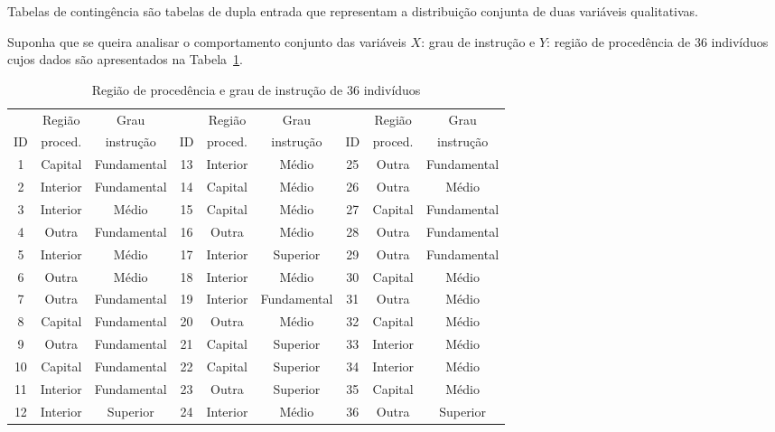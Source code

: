 \documentclass[11pt,fleqn]{book} %
\begin{document}
Tabelas de contingência são tabelas de dupla entrada que representam a distribuição conjunta de duas variáveis qualitativas. \\

\begin{example} \label{exemp:distconjinstrucaoprocedencia1}

Suponha que se queira analisar o comportamento conjunto das variáveis $X$: grau de instrução e $Y$: região de procedência de 36 indivíduos cujos dados são apresentados na Tabela~\ref{tab:instrucaoprocedencia}. \\

\begin{table}[h]
	\caption{Região de procedência e grau de instrução de 36 indivíduos}
	\label{tab:instrucaoprocedencia} 
	\vspace{-0.1cm}
	\centering
	\begin{tabular}{c c c | c c c | c c c}
	\toprule
  		&	Região & Grau	& 	&   Região	& Grau 	&	 	&	Região & Grau	 \\
  	ID	& proced. &	instrução & ID &	proced. & instrução	&	ID	& proced. &	instrução\\
  	\hline
	1	&	Capital	&	Fundamental	&	13	&	Interior	&	Médio	&	25	&	Outra	&	Fundamental	\\
	2	&	Interior	&	Fundamental	&	14	&	Capital	&	Médio	&	26	&	Outra	&	Médio	\\
	3	&	Interior	&	Médio	&	15	&	Capital	&	Médio	&	27	&	Capital	&	Fundamental	\\
	4	&	Outra	&	Fundamental	&	16	&	Outra	&	Médio	&	28	&	Outra	&	Fundamental	\\
	5	&	Interior	&	Médio	&	17	&	Interior	&	Superior	&	29	&	Outra	&	Fundamental	\\
	6	&	Outra	&	Médio	&	18	&	Interior	&	Médio	&	30	&	Capital	&	Médio	\\
	7	&	Outra	&	Fundamental	&	19	&	Interior	&	Fundamental	&	31	&	Outra	&	Médio	\\
	8	&	Capital	&	Fundamental	&	20	&	Outra	&	Médio	&	32	&	Capital	&	Médio	\\
	9	&	Outra	&	Fundamental	&	21	&	Capital	&	Superior	&	33	&	Interior	&	Médio	\\
	10	&	Capital	&	Fundamental	&	22	&	Capital	&	Superior	&	34	&	Interior	&	Médio	\\
	11	&	Interior	&	Fundamental	&	23	&	Outra	&	Superior	&	35	&	Capital	&	Médio	\\
	12	&	Interior	&	Superior	&	24	&	Interior	&	Médio	&	36	&	Outra	&	Superior	\\
	\bottomrule
	\end{tabular}
\end{table}



\end{example}
\end{document}
